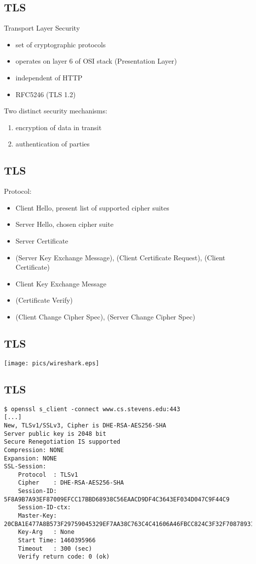 \documentclass[xga]{xdvislides}
\begin{document}
\subsection{TLS}
Transport Layer Security
\begin{itemize}
	\item set of cryptographic protocols
	\item operates on layer 6 of OSI stack (Presentation Layer)
	\item independent of HTTP
	\item RFC5246 (TLS 1.2)
\end{itemize}
\addvspace{.5in}
Two distinct security mechanisms:
\begin{enumerate}
	\item encryption of data in transit
	\item authentication of parties
\end{enumerate}

\subsection{TLS}
Protocol:
\begin{itemize}
	\item Client Hello, present list of supported cipher suites
	\item Server Hello, chosen cipher suite
	\item Server Certificate
	\item (Server Key Exchange Message), (Client Certificate Request), (Client Certificate)
	\item Client Key Exchange Message
	\item (Certificate Verify)
	\item (Client Change Cipher Spec), (Server Change Cipher Spec)
\end{itemize}

\subsection{TLS}
\begin{center}
	\texttt{[image: pics/wireshark.eps]}
\end{center}

\subsection{TLS}
\begin{verbatim}
$ openssl s_client -connect www.cs.stevens.edu:443
[...]
New, TLSv1/SSLv3, Cipher is DHE-RSA-AES256-SHA
Server public key is 2048 bit
Secure Renegotiation IS supported
Compression: NONE
Expansion: NONE
SSL-Session:
    Protocol  : TLSv1
    Cipher    : DHE-RSA-AES256-SHA
    Session-ID: 5F8A9B7A93EF87009EFCC17BBD68938C56EAACD9DF4C3643EF034D047C9F44C9
    Session-ID-ctx: 
    Master-Key: 20CBA1E477A8B573F29759045329EF7AA38C763C4C41606A46FBCC824C3F32F708789311E7B4275470E35CF09518FDCD
    Key-Arg   : None
    Start Time: 1460395966
    Timeout   : 300 (sec)
    Verify return code: 0 (ok)
\end{verbatim}
\end{document}
